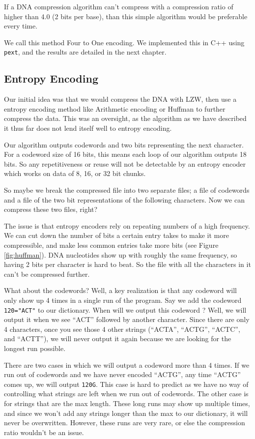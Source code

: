 \documentclass[12pt,twoside]{reedthesis}
\begin{document}
If a DNA compression algorithm can't compress with a compression ratio of higher than 4.0 (2 bits per base), than this simple algorithm would be preferable every time.

We call this method Four to One encoding. We implemented this in C++ using \texttt{pext}, and the results are detailed in the next chapter.

\hypertarget{entropy-encoding}{%
\subsection{Entropy Encoding}\label{entropy-encoding}}

Our initial idea was that we would compress the DNA with LZW, then use a entropy encoding method like Arithmetic encoding or Huffman to further compress the data. This was an oversight, as the algorithm as we have described it thus far does not lend itself well to entropy encoding.

Our algorithm outputs codewords and two bits representing the next character. For a codeword size of 16 bits, this means each loop of our algorithm outputs 18 bits. So any repetitiveness or reuse will not be detectable by an entropy encoder which works on data of 8, 16, or 32 bit chunks.

So maybe we break the compressed file into two separate files; a file of codewords and a file of the two bit representations of the following characters. Now we can compress these two files, right?

The issue is that entropy encoders rely on repeating numbers of a high frequency. We can cut down the number of bits a certain entry takes to make it more compressible, and make less common entries take more bits (see Figure \ref{fig:huffman}). DNA nucleotides show up with roughly the same frequency, so having 2 bits per character is hard to beat. So the file with all the characters in it can't be compressed further.

What about the codewords? Well, a key realization is that any codeword will only show up 4 times in a single run of the program. Say we add the codeword \texttt{120="ACT"} to our dictionary. When will we output this codeword ? Well, we will output it when we see ``ACT'' followed by another character. Since there are only 4 characters, once you see those 4 other strings (``ACTA'', ``ACTG'', ``ACTC'', and ``ACTT''), we will never output it again because we are looking for the longest run possible.

There are two cases in which we will output a codeword more than 4 times. If we run out of codewords and we have never encoded ``ACTG'', any time ``ACTG'' comes up, we will output \texttt{120G}. This case is hard to predict as we have no way of controlling what strings are left when we run out of codewords. The other case is for strings that are the max length. These long runs may show up multiple times, and since we won't add any strings longer than the max to our dictionary, it will never be overwritten. However, these runs are very rare, or else the compression ratio wouldn't be an issue.
\end{document}
